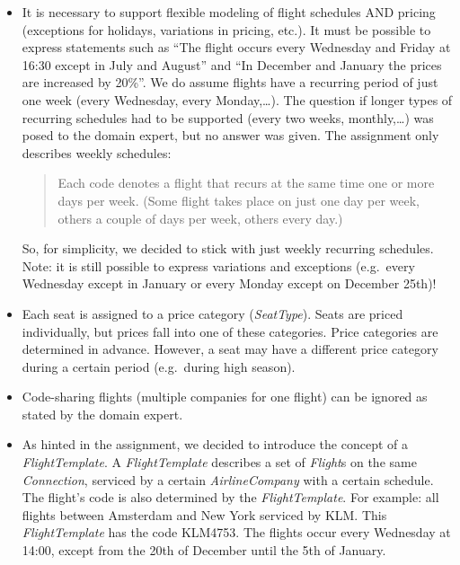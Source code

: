 \documentclass[a4paper]{article}
\newcommand{\field}[1]{\emph{#1}}
\begin{document}
\begin{itemize}

\item It is necessary to support flexible modeling of flight schedules AND pricing (exceptions for holidays, variations in pricing, etc.).
It must be possible to express statements such as ``The flight occurs every Wednesday and Friday at 16:30 except in July and August'' and ``In December and January the prices are increased by 20\%''.
We do assume flights have a recurring period of just one week (every Wednesday, every Monday,\dots).
The question if longer types of recurring schedules had to be supported (every two weeks, monthly,\dots) was posed to the domain expert, but no answer was given.
The assignment only describes weekly schedules:

\begin{quote}
Each code denotes a flight that recurs at the same time one or more days per week.
(Some flight takes place on just one day per week, others a couple of days per week, others every day.)
\end{quote}

So, for simplicity, we decided to stick with just weekly recurring schedules.
Note: it is still possible to express variations and exceptions (e.g.\ every Wednesday except in January or every Monday except on December 25th)!

\item Each seat is assigned to a price category (\field{SeatType}).
Seats are priced individually, but prices fall into one of these categories.
Price categories are determined in advance.
However, a seat may have a different price category during a certain period (e.g.\ during high season).

\item Code-sharing flights (multiple companies for one flight) can be ignored as stated by the domain expert.

\item As hinted in the assignment, we decided to introduce the concept of a \field{FlightTemplate}.
A \field{FlightTemplate} describes a set of \field{Flight}s on the same \field{Connection}, serviced by a certain \field{AirlineCompany} with a certain schedule.
The flight's code is also determined by the \field{FlightTemplate}.
For example: all flights between Amsterdam and New York serviced by KLM\@. This \field{FlightTemplate} has the code KLM4753.
The flights occur every Wednesday at 14:00, except from the 20th of December until the 5th of January.


\end{itemize}
\end{document}
